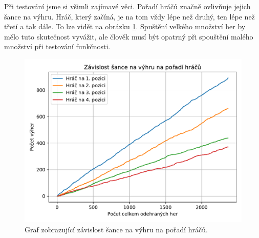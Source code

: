 \documentclass[a4paper,11pt]{article}
\begin{document}
	Při testování jsme si všimli zajímavé věci. Pořadí hráčů značně ovlivňuje jejich šance na výhru. Hráč, který začíná, je na tom vždy lépe než druhý, ten lépe než třetí a tak dále. To lze vidět na obrázku \ref{fig:order}. Spuštění velkého množství her by mělo tuto skutečnost vyvážit, ale člověk musí být opatrný při spouštění malého množství při testování funkčnosti.
	
	\begin{figure}[ht]
		\centering
		\includegraphics[scale=0.65]{win_prob.pdf}
		\caption{Graf zobrazující závislost šance na výhru na pořadí hráčů.}
		\label{fig:order}
	\end{figure}
	
\end{document}
